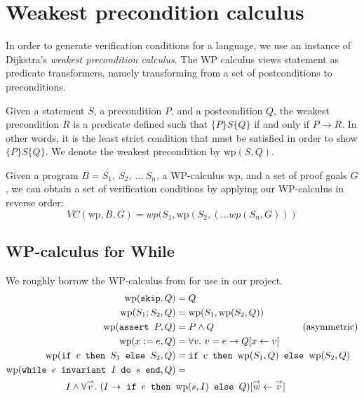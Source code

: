 \section{Weakest precondition calculus} %

In order to generate verification conditions for a language,
we use an instance of Dijkstra's \textit{weakest precondition calculus}.
The WP calculus views statement as predicate transformers,
namely transforming from a set of postconditions to preconditions.

\newcommand{\wpp}{\mathrm{wp}}
\renewcommand{\implies}{\rightarrow}

Given a statement $S$, a precondition $P$, and a postcondition $Q$,
the weakest precondition $R$ is a predicate defined
such that $\{P\} S \{Q\}$ if and only if $P \implies R$.
In other words, it is the least strict condition that must be satisfied
in order to show $\{P\} S \{Q\}$.
We denote the weakest precondition by $\wpp(S, Q)$.

Given a program $B = S_1,~S_2,~...~S_n$, a WP-calculus $\wpp$, and a set of proof goals $G$,
we can obtain a set of verification conditions by applying our WP-calculus in reverse order:
\[
    VC(\wpp, B, G) = wp(S_1, \wpp(S_2, (... wp(S_n, G)))
\]

\subsection{WP-calculus for While} \label{sec:whilewp}

We roughly borrow the WP-calculus from \cite{jlamp} for use in our project.
\begin{align}
    \wpp(\inl{skip}, Q) &= Q \\
    \wpp(S_1; S_2, Q) &= \wpp(S_1, \wpp(S_2, Q)) \\
    \wpp(\inl{assert } P, Q) &= P \land Q ~~~~~~~~~~~~~~~~~~~~~~~~~~~~(\text{asymmetric})\\
    \wpp(x := e, Q) &= \forall v.~v = e \implies Q[x \leftarrow v] \\
    \wpp(\inl{if } c \inl{ then } S_1 \inl{ else } S_2, Q) &=
        \inl{if } c \inl{ then } \wpp(S_1, Q) \inl{ else } \wpp(S_2, Q) \\
    \wpp(\inl{while } e \inl{ invariant } I \inl{ do } s \inl{ end}, Q) &=\\
        I \land \forall \overset{\rightarrow} v. ~
        (I \implies \
        \inl{if } e \inl{ then } &\wpp(s, I) \inl{ else } Q)
        [\overset{\rightarrow} w \leftarrow \overset{\rightarrow} v]
\end{align}


